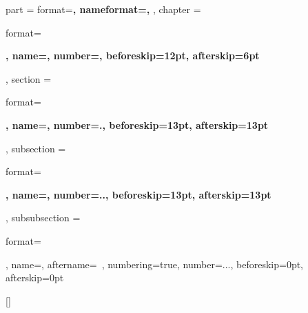 

\ctexset
{
    part =
    {
        format=\centering{}\bfseries,
        nameformat=\centering\heiti\fontsize{48}{48}\bfseries,
    },
    chapter =
    {
        format=\raggedright{}\bfseries,
        name={},
        number=,
        beforeskip=12pt,
        afterskip=6pt
    },
    section =
    {
        format=\raggedright{}\bfseries,
        name={},
        number=.,
        beforeskip=13pt,
        afterskip=13pt
    },
    subsection =
    {
        format=\raggedright{}\bfseries,
        name={},
        number=..,
        beforeskip=13pt,
        afterskip=13pt
    },
    subsubsection =
    {
        format=\raggedright{},
        name={},
        aftername=~,
        numbering=true,
        number=...,
        beforeskip=0pt,
        afterskip=0pt
    }
}

\makeatletter
{}
\makeatother

\renewcommand{\contentsname}{ \zihao{2}\heiti 目\ \ 录\vspace{1em}}

[\bibname]{
}
